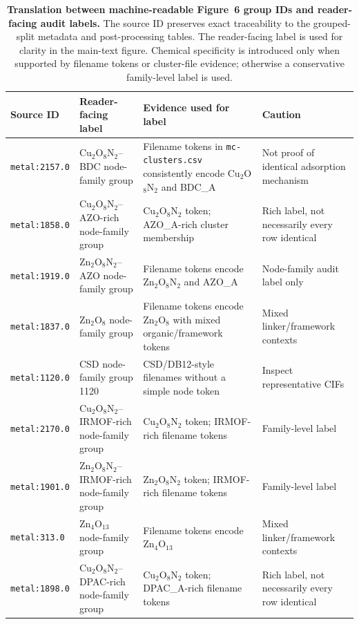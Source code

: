 \documentclass[11pt,a4paper]{article}
\begin{document}
\begin{table}[H]
\centering
\scriptsize
\caption{\textbf{Translation between machine-readable Figure~6 group IDs and reader-facing audit labels.}
The source ID preserves exact traceability to the grouped-split metadata and post-processing tables.
The reader-facing label is used for clarity in the main-text figure. Chemical specificity is introduced
only when supported by filename tokens or cluster-file evidence; otherwise a conservative family-level
label is used.}
\label{tab:si_label_translation}
\setlength{\tabcolsep}{4pt}
\begin{tabular}{p{}p{}p{}p{}}
\toprule
\textbf{Source ID} & \textbf{Reader-facing label} & \textbf{Evidence used for label} & \textbf{Caution} \\
\midrule
\texttt{metal:2157.0} & Cu$_2$O$_8$N$_2$--BDC node-family group & Filename tokens in \texttt{mc-clusters.csv} consistently encode Cu$_2$O$_8$N$_2$ and BDC\_A & Not proof of identical adsorption mechanism \\
\texttt{metal:1858.0} & Cu$_2$O$_8$N$_2$--AZO-rich node-family group & Cu$_2$O$_8$N$_2$ token; AZO\_A-rich cluster membership & Rich label, not necessarily every row identical \\
\texttt{metal:1919.0} & Zn$_2$O$_8$N$_2$--AZO node-family group & Filename tokens encode Zn$_2$O$_8$N$_2$ and AZO\_A & Node-family audit label only \\
\texttt{metal:1837.0} & Zn$_2$O$_8$ node-family group & Filename tokens encode Zn$_2$O$_8$ with mixed organic/framework tokens & Mixed linker/framework contexts \\
\texttt{metal:1120.0} & CSD node-family group 1120 & CSD/DB12-style filenames without a simple node token & Inspect representative CIFs \\
\texttt{metal:2170.0} & Cu$_2$O$_8$N$_2$--IRMOF-rich node-family group & Cu$_2$O$_8$N$_2$ token; IRMOF-rich filename tokens & Family-level label \\
\texttt{metal:1901.0} & Zn$_2$O$_8$N$_2$--IRMOF-rich node-family group & Zn$_2$O$_8$N$_2$ token; IRMOF-rich filename tokens & Family-level label \\
\texttt{metal:313.0} & Zn$_4$O$_{13}$ node-family group & Filename tokens encode Zn$_4$O$_{13}$ & Mixed linker/framework contexts \\
\texttt{metal:1898.0} & Cu$_2$O$_8$N$_2$--DPAC-rich node-family group & Cu$_2$O$_8$N$_2$ token; DPAC\_A-rich filename tokens & Rich label, not necessarily every row identical \\

\end{tabular}
\end{table}
\end{document}
